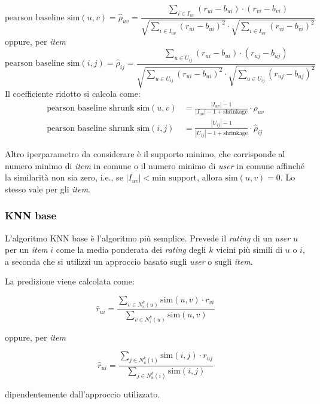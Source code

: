\begin{itemize}
        \[
        \text{pearson baseline sim}(u, v) = \hat{\rho}_{uv} = \frac{\sum\limits_{i \in I_{uv}} (r_{ui} - b_{ui}) \cdot (r_{vi} - b_{vi})}{\sqrt{\sum\limits_{i \in I_{uv}} (r_{ui} - b_{ui})^2} \cdot \sqrt{\sum\limits_{i \in I_{uv}} (r_{vi} - b_{vi})^2}}
        \]
        oppure, per \textit{item}
        \[
        \text{pearson baseline sim}(i, j) = \hat{\rho}_{ij} = \frac{\sum\limits_{u \in U_{ij}} (r_{ui} - b_{ui}) \cdot (r_{uj} - b_{uj})}{\sqrt{\sum\limits_{u \in U_{ij}} (r_{ui} - b_{ui})^2} \cdot \sqrt{\sum\limits_{u \in U_{ij}} (r_{uj} - b_{uj})^2}}
        \]
        Il coefficiente ridotto si calcola come:
        \begin{align*}
            \text{pearson baseline shrunk sim}(u, v) &= \frac{|I_{uv}| - 1}{|I_{uv}| - 1 + \text{shrinkage}} \cdot \hat{\rho}_{uv} \\
            \text{pearson baseline shrunk sim}(i, j) &= \frac{|U_{ij}| - 1}{|U_{ij}| - 1 + \text{shrinkage}} \cdot \hat{\rho}_{ij}
        \end{align*}
\end{itemize}

Altro iperparametro da considerare è il supporto minimo, che corrisponde al numero minimo di \textit{item} in comune o il numero minimo di \textit{user} in comune affinché la similarità non sia zero, i.e., se $|I_{uv}| < \text{min support}$, allora $\text{sim}(u, v) = 0$. Lo stesso vale per gli \textit{item}.

\subsubsection{KNN base}

L'algoritmo KNN base è l'algoritmo più semplice. Prevede il  \textit{rating} di un \textit{user} $u$ per un \textit{item} $i$ come la media ponderata dei \textit{rating} degli $k$ vicini più simili di $u$ o $i$, a seconda che si utilizzi un approccio basato sugli \textit{user} o sugli \textit{item}.

La predizione viene calcolata come:

\[
\hat{r}_{ui} = \frac{\sum\limits_{v \in N^k_i(u)} \text{sim}(u, v) \cdot r_{vi}}{\sum\limits_{v \in N^k_i(u)} \text{sim}(u, v)}
\]

oppure, per \textit{item}

\[
\hat{r}_{ui} = \frac{\sum\limits_{j \in N^k_u(i)} \text{sim}(i, j) \cdot r_{uj}}{\sum\limits_{j \in N^k_u(i)} \text{sim}(i, j)}
\]

dipendentemente dall'approccio utilizzato.

